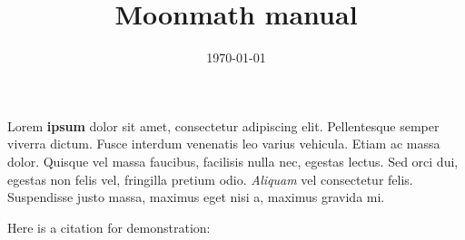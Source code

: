 \documentclass[a4paper, 12pt]{book}
\title{Moonmath manual}
\author{}
\date{\today}
\theoremstyle{plain}
\begin{document}
\maketitle

Lorem \textbf{ipsum} dolor sit amet, consectetur adipiscing elit. Pellentesque semper viverra dictum.  Fusce interdum venenatis leo varius vehicula. Etiam ac massa dolor. Quisque vel massa faucibus, facilisis nulla nec, egestas lectus. Sed orci dui, egestas non felis vel, fringilla pretium odio. \textit{Aliquam} vel consectetur felis. Suspendisse justo massa, maximus eget nisi a, maximus gravida mi.

Here is a citation for demonstration: \cite{lamport1982the}







\end{document}
